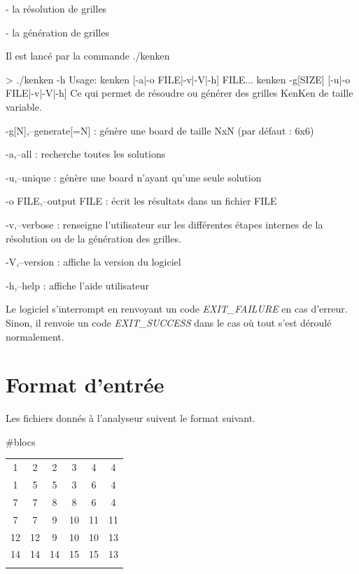 \documentclass[1]{report}
\begin{document}
    - la résolution de grilles \par
    - la génération de grilles \newline
    
    
    Il est lancé par la commande ./kenken
    
    > ./kenken -h \newline
    Usage: \newline
    kenken [-a|-o FILE|-v|-V|-h] FILE... \newline
    kenken -g[SIZE] [-u|-o FILE|-v|-V|-h] \newline
    Ce qui permet de résoudre ou générer des grilles KenKen de taille variable. \newline

    -g[N],--generate[=N] : génère une board de taille NxN (par défaut : 6x6)
    
    -a,--all : recherche toutes les solutions
    
    -u,--unique : génère une board n'ayant qu'une seule solution
    
    -o FILE,--output FILE : écrit les résultats dans un fichier FILE
    
    -v,--verbose : renseigne l'utilisateur sur les différentes étapes internes de la résolution ou de la génération des grilles.
    
    -V,--version : affiche la version du logiciel
    
    -h,--help : affiche l'aide utilisateur \newline

    Le logiciel s'interrompt en renvoyant un code \textit{EXIT\_FAILURE} en cas d'erreur.
    Sinon, il renvoie un code \textit{EXIT\_SUCCESS} dans le cas où tout s'est déroulé normalement.

    \section{Format d'entrée}
    
    Les fichiers donnés à l'analyseur suivent le format suivant.\newline
    
    \#blocs \newline
    \par
    \begin{tabular}{c c c c c c}
    1 & 2 & 2 & 3 & 4 & 4 \\
    1 & 5 & 5 & 3 & 6 & 4 \\
    7 & 7 & 8 & 8 & 6 & 4 \\
    7 & 7 & 9 & 10 & 11 & 11 \\
    12 & 12 & 9 & 10 & 10 & 13 \\
    14 & 14 & 14 & 15 & 15 & 13 \\ \newline
    \end{tabular} \newline
    
\end{document}
